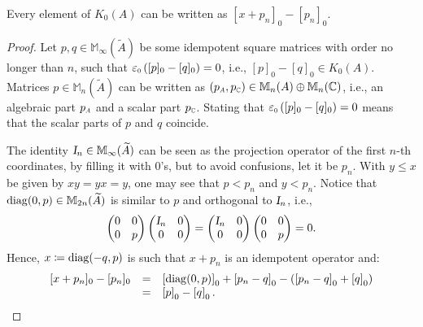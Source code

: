 \begin{proposicao}
Every element of $K_0(A)$ can be written as $[x+p_n]_0-[p_n]_0$.

\begin{proof}
Let $p, q \in \mathbb M_{\infty}(\widetilde A)$ be some idempotent square matrices with order no longer than $n$, such that $\sub\ep0\left([p]_0 - [q]_0\right) = 0$, i.e., $[p]_0 - [q]_0 \in K_0(A)$. Matrices $p \in \mathbb M_n(\widetilde{A})$ can be written as $(\sub pA, \sub p{\C}) \in \mathbb M_n(A)\oplus \mathbb M_n(\C)$, i.e., an algebraic part $\sub pA$ and a scalar part $\sub p{\C}$. Stating that  $\sub\ep0\left([p]_0 - [q]_0\right) = 0$ means that the scalar parts of $p$ and $q$ coincide.

The identity $\textsl{I}_n \in \mathbb M_\infty(\widetilde{A})$ can be seen as the projection operator of the first $n$-th coordinates, by filling it with 0's, but to avoid confusions, let it be $p_n$. With $y\leqslant x$ be given by $xy = yx = y$, one may see that $p < p_n$ and $y < p_n$. Notice that
$\operatorname{diag}(0,p) \in \mathbb M_{2n}(\widetilde{A})$ is similar to $p$ and orthogonal to $\textsl{I}_n$, i.e., 
\[
\begin{pmatrix}
    0 & 0 \\ 0 & p
\end{pmatrix}
\begin{pmatrix}
    \textsl{I}_n & 0 \\ 0 & 0 
\end{pmatrix} = 
\begin{pmatrix}
    \textsl{I}_n & 0 \\ 0 & 0 
\end{pmatrix} \begin{pmatrix}
    0 & 0 \\ 0 & p
\end{pmatrix} = 0.
    \] 
Hence, $x \coloneqq \operatorname{diag}(-q,p)$ is such that $x+p_n$ is an idempotent operator and:
\begin{equation*}
    \begin{array}{rcl}
        [x+p_n]_0 - [p_n]_0 &=& \left[\diag(0,p)\right]_0 + \left[p_n - q\right]_0 - \left(\left[p_n-q\right]_0 + \left[q\right]_0\right) \\
        &=& \left[p\right]_0 - \left[q\right]_0. 
    \end{array}\hfill \qedhere
\end{equation*}
\end{proof}
\end{proposicao}

